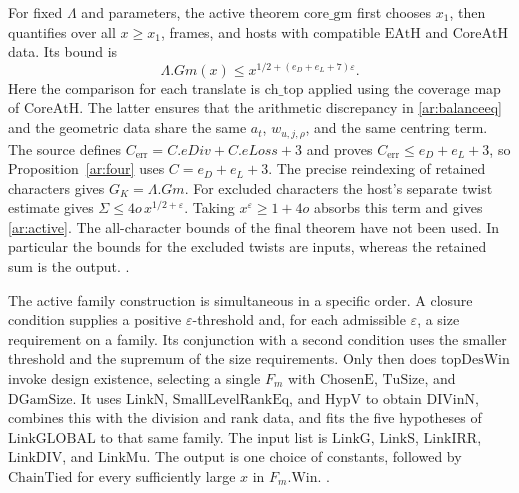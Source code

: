 For fixed \(\Lambda\) and parameters, the active theorem \(\mathrm{core\_gm}\) first chooses \(x_1\), then quantifies over all \(x\ge x_1\), frames, and hosts with compatible \(\mathrm{EAtH}\) and \(\mathrm{CoreAtH}\) data. Its bound is
\begin{equation}\label{ar:active}
 \Lambda.Gm(x)\le x^{1/2+(e_D+e_L+7)\varepsilon}.
\end{equation}
Here the comparison for each translate is \(\mathrm{ch\_top}\) applied using the coverage map of \(\mathrm{CoreAtH}\). The latter ensures that the arithmetic discrepancy in \eqref{ar:balanceeq} and the geometric data share the same \(a_t\), \(w_{u,j,\rho}\), and the same centring term. The source defines \(C_{\mathrm{err}}=C.eDiv+C.eLoss+3\) and proves \(C_{\mathrm{err}}\le e_D+e_L+3\), so Proposition~\ref{ar:four} uses \(C=e_D+e_L+3\). The precise reindexing of retained characters gives \(G_K=\Lambda.Gm\). For excluded characters the host's separate twist estimate gives \(\Sigma\le4o\,x^{1/2+\varepsilon}\). Taking \(x^\varepsilon\ge1+4o\) absorbs this term and gives \eqref{ar:active}. The all-character bounds of the final theorem have not been used. In particular the bounds for the excluded twists are inputs, whereas the retained sum is the output. \quad
{}\quad
{}\quad
{}.

The active family construction is simultaneous in a specific order. A closure condition supplies a positive \(\varepsilon\)-threshold and, for each admissible \(\varepsilon\), a size requirement on a family. Its conjunction with a second condition uses the smaller threshold and the supremum of the size requirements. Only then does \(\mathrm{topDesWin}\) invoke design existence, selecting a single \(F_m\) with \(\mathrm{ChosenE}\), \(\mathrm{TuSize}\), and \(\mathrm{DGamSize}\). It uses \(\mathrm{LinkN}\), \(\mathrm{SmallLevelRankEq}\), and \(\mathrm{HypV}\) to obtain \(\mathrm{DIVinN}\), combines this with the division and rank data, and fits the five hypotheses of \(\mathrm{LinkGLOBAL}\) to that same family. The input list is \(\mathrm{LinkG}\), \(\mathrm{LinkS}\), \(\mathrm{LinkIRR}\), \(\mathrm{LinkDIV}\), and \(\mathrm{LinkMu}\). The output is one choice of constants, followed by \(\mathrm{ChainTied}\) for every sufficiently large \(x\) in \(F_m.\mathrm{Win}\). \quad
{}\quad
{}.

